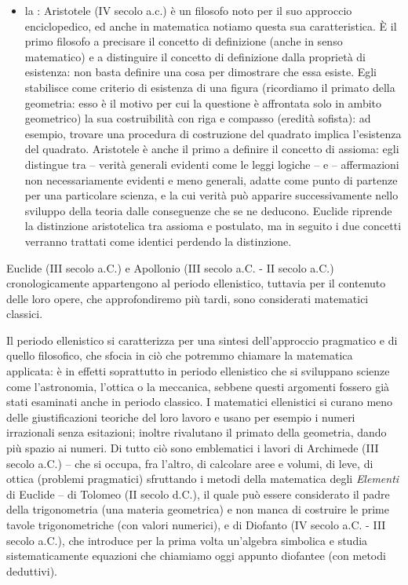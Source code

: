 \begin{itemize}
	\item la : Aristotele (IV secolo a.c.) \`e un filosofo noto per il suo approccio enciclopedico, ed anche in matematica notiamo questa sua caratteristica. \`E il primo filosofo a precisare il concetto di definizione (anche in senso matematico) e a distinguire il concetto di definizione dalla propriet\`a di esistenza: non basta definire una cosa per dimostrare che essa esiste. Egli stabilisce come criterio di esistenza di una figura (ricordiamo il primato della geometria: esso \`e il motivo per cui la questione \`e affrontata solo in ambito geometrico) la sua costruibilit\`a con riga e compasso (eredit\`a sofista): ad esempio, trovare una procedura di costruzione del quadrato implica l'esistenza del quadrato. Aristotele \`e anche il primo a definire il concetto di assioma: egli distingue tra  -- verit\`a generali evidenti come le leggi logiche -- e  -- affermazioni non necessariamente evidenti e meno generali, adatte come punto di partenze per una particolare scienza, e la cui verit\`a pu\`o apparire successivamente nello sviluppo della teoria dalle conseguenze che se ne deducono. Euclide riprende la distinzione aristotelica tra assioma e postulato, ma in seguito i due concetti verranno trattati come identici perdendo la distinzione.
\end{itemize}
\par Euclide (III secolo a.C.) e Apollonio (III secolo a.C. - II secolo a.C.) cronologicamente appartengono al periodo ellenistico, tuttavia per il contenuto delle loro opere, che approfondiremo pi\`u tardi, sono considerati matematici classici.
\par Il periodo ellenistico si caratterizza per una sintesi dell'approccio pragmatico e di quello filosofico, che sfocia in ci\`o che potremmo chiamare la matematica applicata: \`e in effetti soprattutto in periodo ellenistico che si sviluppano scienze come l'astronomia, l'ottica o la meccanica, sebbene questi argomenti fossero gi\`a stati esaminati anche in periodo classico. I matematici ellenistici si curano meno delle giustificazioni teoriche del loro lavoro e usano per esempio i numeri irrazionali senza esitazioni; inoltre rivalutano il primato della geometria, dando pi\`u spazio ai numeri. Di tutto ci\`o sono emblematici i lavori di Archimede (III secolo a.C.) -- che si occupa, fra l'altro, di calcolare aree e volumi, di leve, di ottica (problemi pragmatici) sfruttando i metodi della matematica degli \textit{Elementi} di Euclide -- di Tolomeo (II secolo d.C.), il quale pu\`o essere considerato il padre della trigonometria (una materia geometrica) e non manca di costruire le prime tavole trigonometriche (con valori numerici), e di Diofanto (IV secolo a.C. - III secolo a.C.), che introduce per la prima volta un'algebra simbolica e studia sistematicamente equazioni che chiamiamo oggi appunto diofantee (con metodi deduttivi).
